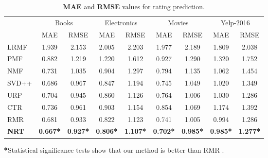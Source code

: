 \documentclass[sigconf]{acmart}
\begin{document}
\begin{table*}[t]
	\begin{threeparttable}
		\centering
		\caption{ \textbf{MAE} and \textbf{RMSE} values for rating prediction. }
		\label{tab:rmse}
		\begin{tabular}{@{}lcc cc cc cc@{}}
			\toprule
			& \multicolumn{2}{c}{Books} & \multicolumn{2}{c}{Electronics} &
			\multicolumn{2}{c}{Movies} & \multicolumn{2}{c}{Yelp-2016}\\
			\cmidrule(lr){2-3}
			\cmidrule(lr){4-5}
			\cmidrule(lr){6-7}
			\cmidrule(lr){8-9}
			& MAE & RMSE  & MAE & RMSE & MAE & RMSE & MAE & RMSE\\
			\midrule
			LRMF & 1.939\phantom{0} & 2.153\phantom{0}
			& 2.005\phantom{0} & 2.203\phantom{0}
			& 1.977\phantom{0} & 2.189\phantom{0}
			& 1.809\phantom{0} & 2.038\phantom{0}   \\
			PMF & 0.882\phantom{0} & 1.219\phantom{0}
			& 1.220\phantom{0} & 1.612\phantom{0}
			& 0.927\phantom{0} & 1.290\phantom{0}
			& 1.320\phantom{0} & 1.752\phantom{0} \\
			NMF & 0.731\phantom{0} & 1.035\phantom{0}
			& 0.904\phantom{0} & 1.297\phantom{0}
			& 0.794\phantom{0} & 1.135\phantom{0}
			& 1.062\phantom{0} & 1.454\phantom{0}  \\
			SVD++ & 0.686\phantom{0} & 0.967\phantom{0}
			& 0.847\phantom{0} & 1.194\phantom{0}
			& 0.745\phantom{0} & 1.049\phantom{0}
			& 1.020\phantom{0} & 1.349\phantom{0} \\
			URP & 0.704\phantom{0} & 0.945\phantom{0}
			& 0.860\phantom{0} & 1.126\phantom{0}
			& 0.764\phantom{0} & 1.006\phantom{0}
			& 1.030\phantom{0} & 1.286\phantom{0} \\
			CTR &  0.736\phantom{0} &  0.961\phantom{0}
			&  0.903\phantom{0} &  1.154\phantom{0}
			& 0.854\phantom{0} &  1.069\phantom{0}
			& 1.174\phantom{0} &  1.392\phantom{0} \\
			RMR & 0.681\phantom{0} & 0.933\phantom{0}
			& 0.822\phantom{0} & 1.123\phantom{0}
			& 0.741\phantom{0} & 1.005\phantom{0}
			& 0.994\phantom{0} &  1.286\phantom{0} \\
			\textbf{NRT} & \textbf{0.667}\textbf{*} & \textbf{0.927}\textbf{*}
			& \textbf{0.806}\textbf{*} & \textbf{1.107}\textbf{*}
			& \textbf{0.702}\textbf{*} & \textbf{0.985}\textbf{*}
			& \textbf{0.985}\textbf{*} & \textbf{1.277}\textbf{*}  \\
			\bottomrule
		\end{tabular}
		\begin{tablenotes}
			\small
			\item \textbf{*}Statistical significance tests show that our method is better than RMR \cite{ling2014ratings}.
		\end{tablenotes}
	\end{threeparttable}
\end{table*}
\end{document}
